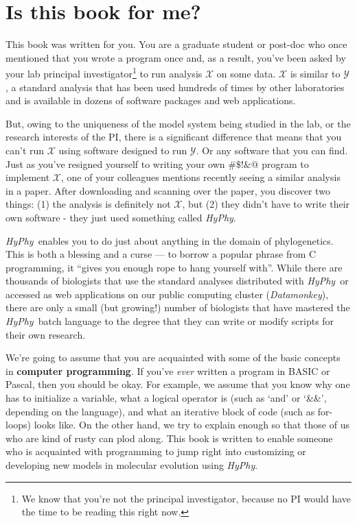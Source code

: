 \documentclass[12pt,twoside,openright]{book}
\newcommand{\hyphy}{\textit{HyPhy}}
\begin{document}

\section {Is this book for me?}

This book was written for you.  You are a graduate student or post-doc who once mentioned that you wrote a program once and, as a result, you've been asked by your lab principal investigator\footnote{We know that you're not the principal investigator, because no PI would have the time to be reading this right now.} to run analysis $\mathcal{X}$ on some data.  $\mathcal{X}$ is similar to $\mathcal{Y}$, a standard analysis that has been used hundreds of times by other laboratories and is available in dozens of software packages and web applications.  

But, owing to the uniqueness of the model system being studied in the lab, or the research interests of the PI, there is a significant difference that means that you can't run $\mathcal{X}$ using software designed to run $\mathcal{Y}$.  Or any software that you can find.  Just as you've resigned yourself to writing your own $\#\$!\&@$ program to implement $\mathcal{X}$, one of your colleagues mentions recently seeing a similar analysis in a paper.  After downloading and scanning over the paper, you discover two things: (1) the analysis is definitely not $\mathcal{X}$, but (2) they didn't have to write their own software - they just used something called {\it HyPhy}.  

\hyphy\ enables you to do just about anything in the domain of phylogenetics.  This is both a blessing and a curse --- to borrow a popular phrase from C programming, it ``gives you enough rope to hang yourself with''.  While there are thousands of biologists that use the standard analyses distributed with \hyphy\ or accessed as web applications on our public computing cluster ({\it Datamonkey}), there are only a small (but growing!) number of biologists that have mastered the \hyphy\ batch language to the degree that they can write or modify scripts for their own research.  

We're going to assume that you are acquainted with some of the basic concepts in \textbf{ computer programming}.  If you've {\it ever} written a program in BASIC or Pascal, then you should be okay.  For example, we assume that you know why one has to initialize a variable, what a logical operator is (such as `and' or `\&\&', depending on the language), and what an iterative block of code (such as for-loops) looks like.  On the other hand, we try to explain enough so that those of us who are kind of rusty can plod along.  This book is written to enable someone who is acquainted with programming to jump right into customizing or developing new models in molecular evolution using \hyphy.
\end{document}
